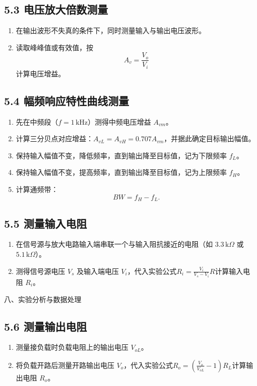 \documentclass[a4paper,12pt]{article}
\begin{document}
\subsection*{5.3 电压放大倍数测量}
\begin{enumerate}
    \item 在输出波形不失真的条件下，同时测量输入与输出电压波形。
    \item 读取峰峰值或有效值，按
          \[
          A_v=\frac{V_o}{V_i}
          \]
          计算电压增益。
\end{enumerate}

\subsection*{5.4 幅频响应特性曲线测量}
\begin{enumerate}
    \item 先在中频段（$f=1\,\mathrm{kHz}$）测得中频电压增益 $A_{vm}$。
    \item 计算三分贝点对应增益：$A_{vL}=A_{vH}=0.707A_{vm}$，并据此确定目标输出幅值。
    \item 保持输入幅值不变，降低频率，直到输出降至目标值，记为下限频率 $f_L$。
    \item 保持输入幅值不变，提高频率，直到输出降至目标值，记为上限频率 $f_H$。
    \item 计算通频带：
          \[
          BW=f_H-f_L.
          \]
\end{enumerate}

\subsection*{5.5 测量输入电阻}
\begin{enumerate}
    \item 在信号源与放大电路输入端串联一个与输入阻抗接近的电阻（如 $3.3\,\mathrm{k}\Omega$ 或 $5.1\,\mathrm{k}\Omega$）。
    \item 测得信号源电压 $V_s$ 及输入端电压 $V_i$，代入实验公式$R_i = \frac{V_i}{V_s - V_i}R$计算输入电阻 $R_i$。
\end{enumerate}八、实验分析与数据处理

\subsection*{5.6 测量输出电阻}
\begin{enumerate}
    \item 测量接负载时负载电阻上的输出电压 $V_{oL}$。
    \item 将负载开路后测量开路输出电压 $V_o$，代入实验公式$R_o = (\frac{V_o}{V_{oL}} - 1)R_L$计算输出电阻 $R_o$。
\end{enumerate}
\end{document}
